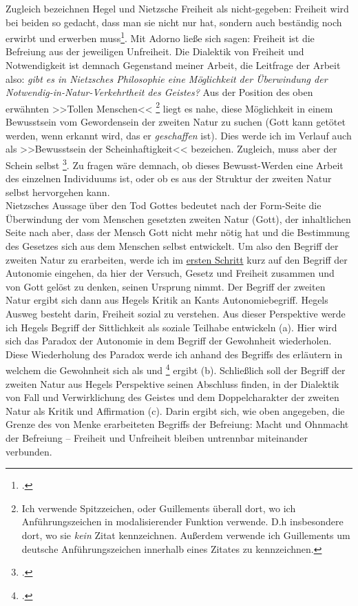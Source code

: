 \documentclass[12pt, a4paper, openany]{report}
\begin{document}
Zugleich bezeichnen Hegel und Nietzsche Freiheit als nicht-gegeben: 
Freiheit wird bei beiden so gedacht, dass man sie \glqq nicht nur hat, sondern auch beständig  noch erwirbt und erwerben muss\grqq\footcite[][636]{nietzsche_morgenrote_1999}. 
Mit Adorno ließe sich sagen: Freiheit ist die Befreiung aus der jeweiligen Unfreiheit.
Die Dialektik von Freiheit und Notwendigkeit ist demnach Gegenstand meiner Arbeit, 
die Leitfrage der Arbeit also: \textit{gibt es in Nietzsches Philosophie eine Möglichkeit der Überwindung der Notwendig-in-Natur-Verkehrtheit des Geistes?}
Aus der Position des oben erwähnten >>Tollen Menschen<<%
\footnote{
    Ich verwende Spitzzeichen, oder Guillements überall dort, wo ich Anführungszeichen in modalisierender Funktion verwende. 
    D.h insbesondere dort, wo sie \emph{kein} Zitat kennzeichnen.
    Außerdem verwende ich Guillements um deutsche Anführungszeichen innerhalb eines Zitates zu kennzeichnen. 
}
liegt es nahe, diese Möglichkeit in einem Bewusstsein vom Gewordensein der zweiten Natur zu suchen (Gott kann getötet werden, wenn erkannt wird, das er \emph{geschaffen} ist). 
Dies werde ich im Verlauf auch als >>Bewusstsein der Scheinhaftigkeit<< bezeichen.
Zugleich, muss aber der Schein selbst \footcite[][417.]{nietzsche_morgenrote_1999}.
Zu fragen wäre demnach, ob dieses Bewusst-Werden eine Arbeit des einzelnen Individuums ist, oder ob es aus der Struktur der zweiten Natur selbst hervorgehen kann.\\

Nietzsches Aussage über den Tod Gottes bedeutet nach der Form-Seite die Überwindung der vom Menschen gesetzten zweiten Natur (Gott), der inhaltlichen Seite nach aber, dass der Mensch Gott nicht mehr nötig hat und die Bestimmung des Gesetzes sich aus dem Menschen selbst entwickelt. 
Um also den Begriff der zweiten Natur zu erarbeiten, werde ich im \hyperref[abschnitt_1]{ersten Schritt} kurz auf den Begriff der Autonomie eingehen, da hier der Versuch, Gesetz und Freiheit zusammen und von Gott gelöst zu denken, seinen Ursprung nimmt. 
Der Begriff der zweiten Natur ergibt sich dann aus Hegels Kritik an Kants Autonomiebegriff.
Hegels Ausweg besteht darin, Freiheit sozial zu verstehen.
Aus dieser Perspektive werde ich Hegels Begriff der Sittlichkeit als soziale Teilhabe entwickeln (a).
Hier wird sich das Paradox der Autonomie in dem Begriff der Gewohnheit wiederholen.
Diese Wiederholung des Paradox werde ich anhand des Begriffs des  erläutern in welchem die Gewohnheit sich als  und \footcite[Vgl.][145]{menke_autonomie_2018} ergibt (b).
Schließlich soll der Begriff der zweiten Natur aus Hegels Perspektive seinen Abschluss finden, in der Dialektik von Fall und Verwirklichung des Geistes und dem Doppelcharakter der zweiten Natur als Kritik und Affirmation (c).
Darin ergibt sich, wie oben angegeben, die Grenze des von Menke erarbeiteten Begriffs der Befreiung:
Macht und Ohnmacht der Befreiung -- Freiheit und Unfreiheit bleiben untrennbar miteinander verbunden.
\end{document}
